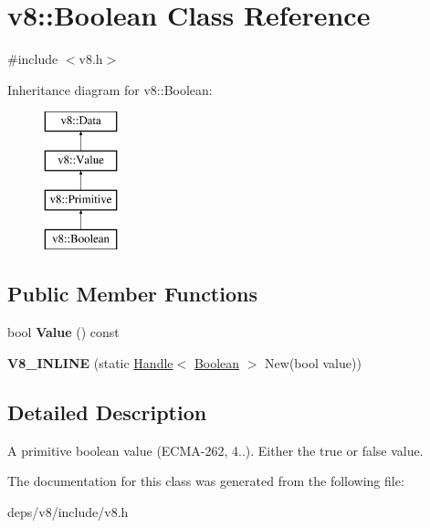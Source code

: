 \hypertarget{classv8_1_1_boolean}{}\section{v8\+:\+:Boolean Class Reference}
\label{classv8_1_1_boolean}


{\ttfamily \#include $<$v8.\+h$>$}

Inheritance diagram for v8\+:\+:Boolean\+:\begin{figure}[H]
\begin{center}
\leavevmode
\includegraphics[height=4.000000cm]{classv8_1_1_boolean}
\end{center}
\end{figure}
\subsection*{Public Member Functions}
\begin{DoxyCompactItemize}
\item 
\hypertarget{classv8_1_1_boolean_aa493d54eb43afc64ab796e1cf66ff910}{}bool {\bfseries Value} () const \label{classv8_1_1_boolean_aa493d54eb43afc64ab796e1cf66ff910}

\item 
\hypertarget{classv8_1_1_boolean_a2d99e44e4f243fc0fd567ad64b88b28d}{}{\bfseries V8\+\_\+\+I\+N\+L\+I\+N\+E} (static \hyperlink{classv8_1_1_handle}{Handle}$<$ \hyperlink{classv8_1_1_boolean}{Boolean} $>$ New(bool value))\label{classv8_1_1_boolean_a2d99e44e4f243fc0fd567ad64b88b28d}

\end{DoxyCompactItemize}


\subsection{Detailed Description}
A primitive boolean value (E\+C\+M\+A-\/262, 4..). Either the true or false value. 

The documentation for this class was generated from the following file\+:\begin{DoxyCompactItemize}
\item 
deps/v8/include/v8.\+h\end{DoxyCompactItemize}
